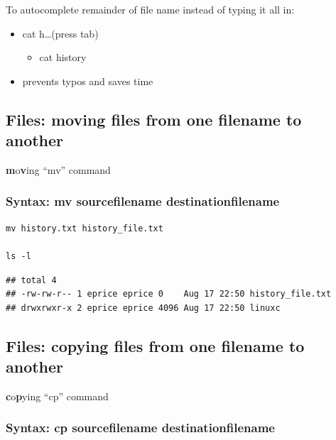 \documentclass[
]{book}
\providecommand{\tightlist}{%
  \setlength{\itemsep}{0pt}\setlength{\parskip}{0pt}}
\begin{document}
To autocomplete remainder of file name instead of typing it all in:

\begin{itemize}
\tightlist
\item
  cat h\ldots(press tab)

  \begin{itemize}
  \tightlist
  \item
    cat history
  \end{itemize}
\item
  prevents typos and saves time
\end{itemize}

\hypertarget{files-moving-files-from-one-filename-to-another}{%
\subsection{Files: moving files from one filename to another}\label{files-moving-files-from-one-filename-to-another}}

\textbf{m}o\textbf{v}ing ``mv'' command

\hypertarget{syntax-mv-sourcefilename-destinationfilename}{%
\subsubsection*{Syntax: mv sourcefilename destinationfilename}\label{syntax-mv-sourcefilename-destinationfilename}}

\begin{verbatim}
mv history.txt history_file.txt

ls -l
\end{verbatim}

\begin{verbatim}
## total 4
## -rw-rw-r-- 1 eprice eprice 0    Aug 17 22:50 history_file.txt 
## drwxrwxr-x 2 eprice eprice 4096 Aug 17 22:50 linuxc
\end{verbatim}

\hypertarget{files-copying-files-from-one-filename-to-another}{%
\subsection{Files: copying files from one filename to another}\label{files-copying-files-from-one-filename-to-another}}

\textbf{c}o\textbf{p}ying ``cp'' command

\hypertarget{syntax-cp-sourcefilename-destinationfilename}{%
\subsubsection*{Syntax: cp sourcefilename destinationfilename}\label{syntax-cp-sourcefilename-destinationfilename}}
\end{document}
